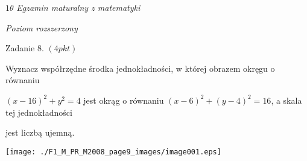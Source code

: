\documentclass[a4paper,12pt]{article}
\begin{document}
$ 1\theta$ {\it Egzamin maturalny z matematyki}

{\it Poziom rozszerzony}

Zadanie 8. $(4pkt)$

Wyznacz współrzędne środka jednokładności, w której obrazem okręgu o równaniu

$(x-16)^{2}+y^{2}=4$ jest okrąg o równaniu $(x-6)^{2}+(y-4)^{2}=16$, a skala tej jednokładności

jest liczbą ujemną.
\begin{center}
\texttt{[image: ./F1\_M\_PR\_M2008\_page9\_images/image001.eps]}
\end{center}
\end{document}
